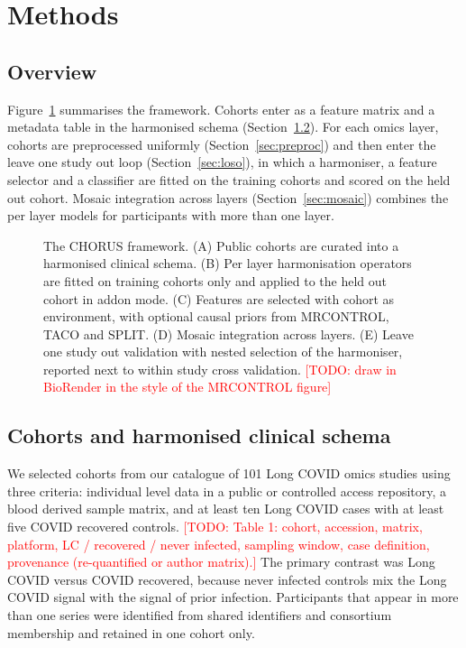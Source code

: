\documentclass[unnumsec,webpdf,contemporary,large]{oup-authoring-template}
\newcommand{\todo}[1]{\textcolor{red}{[TODO: #1]}}
\begin{document}
\section{Methods}

\subsection{Overview}

Figure~\ref{fig:overview} summarises the framework. Cohorts enter as a feature matrix and a metadata table in the harmonised schema (Section~\ref{sec:schema}). For each omics layer, cohorts are preprocessed uniformly (Section~\ref{sec:preproc}) and then enter the leave one study out loop (Section~\ref{sec:loso}), in which a harmoniser, a feature selector and a classifier are fitted on the training cohorts and scored on the held out cohort. Mosaic integration across layers (Section~\ref{sec:mosaic}) combines the per layer models for participants with more than one layer.

\begin{figure}[!t]
\centering
{}
\caption{The CHORUS framework. (A) Public cohorts are curated into a harmonised clinical schema. (B) Per layer harmonisation operators are fitted on training cohorts only and applied to the held out cohort in addon mode. (C) Features are selected with cohort as environment, with optional causal priors from MRCONTROL, TACO and SPLIT. (D) Mosaic integration across layers. (E) Leave one study out validation with nested selection of the harmoniser, reported next to within study cross validation. \todo{draw in BioRender in the style of the MRCONTROL figure}}
\label{fig:overview}
\end{figure}

\subsection{Cohorts and harmonised clinical schema}\label{sec:schema}

We selected cohorts from our catalogue of 101 Long COVID omics studies \citep{pinero2025review} using three criteria: individual level data in a public or controlled access repository, a blood derived sample matrix, and at least ten Long COVID cases with at least five COVID recovered controls. \todo{Table 1: cohort, accession, matrix, platform, LC / recovered / never infected, sampling window, case definition, provenance (re-quantified or author matrix).} The primary contrast was Long COVID versus COVID recovered, because never infected controls mix the Long COVID signal with the signal of prior infection. Participants that appear in more than one series were identified from shared identifiers and consortium membership and retained in one cohort only.
\end{document}
